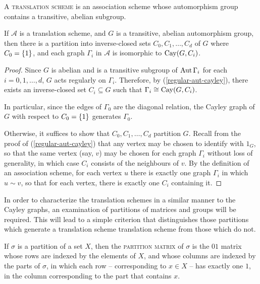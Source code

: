 \documentclass{report}
\newcommand{\AS}{\mathcal{A}}
\begin{document}
    \begin{defn}\label{translation-scheme}
      A \textsc{translation scheme} is an association scheme whose
      automorphism group contains a transitive, abelian subgroup.
    \end{defn}

    \begin{lem}\label{translation-partition}
      If $\AS$ is a translation scheme,
      and $G$ is a transitive, abelian automorphism group,
      then there is a partition into inverse-closed sets
      $C_0, C_1, \ldots, C_d$ of $G$ where $C_0 = \left\lbrace 1 \right\rbrace$,
      and each graph $\Gamma_i$ in $\AS$ is isomorphic to $\operatorname{Cay}(G, C_i)$.
    \end{lem}

    \begin{proof}
      Since $G$ is abelian and is a transitive subgroup of $\operatorname{Aut} \Gamma_i$ for
      each $i = 0, 1, \ldots, d$, $G$ acts regularly on $\Gamma_i$.
      Therefore, by (\ref{regular-aut-cayley}), there exists an inverse-closed
      set $C_i \subseteq G$ such that $\Gamma_i \cong \operatorname{Cay}(G, C_i)$.

      In particular, since the edges of $\Gamma_0$ are the diagonal relation,
      the Cayley graph of $G$ with respect to $C_0 = \left\lbrace 1 \right\rbrace$ generates
      $\Gamma_0$.

      Otherwise, it suffices to show that $C_0, C_1, \ldots, C_d$ partition $G$.
      Recall from the proof of (\ref{regular-aut-cayley}) that any vertex may be
      chosen to identify with $1_G$, so that the same vertex (say, $v$)
      may be chosen for each graph $\Gamma_i$ without loss of generality,
      in which case $C_i$ consists of the neighbours of $v$.  By the definition
      of an association scheme, for each vertex $u$ there is exactly one
      graph $\Gamma_i$ in which $u \sim v$, so that for each vertex, there is
      exactly one $C_i$ containing it.
    \end{proof}

    In order to characterize the translation schemes in a similar manner to the
    Cayley graphs, an examination of partitions of matrices and groups will be
    required.  This will lead to a simple criterion that distinguishes those
    partitions which generate a translation scheme translation scheme from those
    which do not.  \cite[Section~12.10]{godsil}

    \begin{defn}\label{partition-matrix}
      If $\sigma$ is a partition of a set $X$,
      then the \textsc{partition matrix} of $\sigma$
      is the $01$ matrix
      whose rows are indexed by the elements of $X$,
      and whose columns are indexed by the parts of $\sigma$,
      in which each row -- corresponding to $x \in X$ -- has exactly one $1$,
      in the column corresponding to the part that contains $x$.
    \end{defn}
\end{document}
